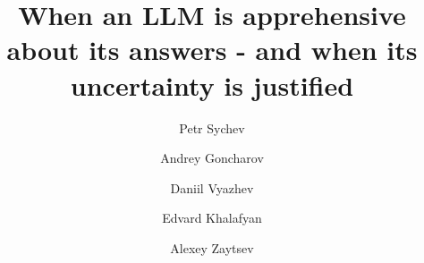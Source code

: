 \documentclass{zapiski}
\begin{document}
\title[When LLM uncertainty is justified]{When an LLM is apprehensive about its answers - and when its uncertainty is justified}


\author[Sychev]{Petr Sychev}
\address[P. Sychev]{Skolkovo Institute of Science and Technology (Skoltech) / Moscow, Russia\\National Research University Higher School of Economics / Moscow, Russia}

\author[Goncharov]{Andrey Goncharov}
\address[A. Goncharov]{Skolkovo Institute of Science and Technology (Skoltech) / Moscow, Russia}

\author[Vyazhev]{Daniil Vyazhev}
\address[D. Vyazhev]{Skolkovo Institute of Science and Technology (Skoltech) / Moscow, Russia\\National Research University Higher School of Economics / Moscow, Russia}

\author[Khalafyan]{Edvard Khalafyan}
\address[E. Khalafyan]{Moscow Institute of Physics and Technology / Moscow, Russia\\Skolkovo Institute of Science and Technology (Skoltech) / Moscow, Russia}

\author[Zaytsev]{Alexey Zaytsev}
\address[A. Zaytsev]{Skolkovo Institute of Science and Technology (Skoltech) / Moscow, Russia}




\maketitle














\appendix

\end{document}
